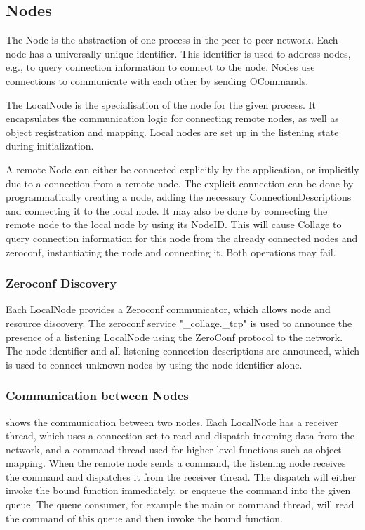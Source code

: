 \subsection{Nodes}

The \textsf{Node} is the abstraction of one process in the peer-to-peer network.
Each node has a universally unique identifier. This identifier is used to
address nodes, e.g., to query connection information to connect to the node.
Nodes use connections to communicate with each other by sending
\textsf{OCommand}s.

The \textsf{LocalNode} is the specialisation of the node for the given process.
It encapsulates the communication logic for connecting remote nodes, as well as
object registration and mapping. Local nodes are set up in the listening state
during initialization.

A remote \textsf{Node} can either be connected explicitly by the application,
or implicitly due to a connection from a remote node. The explicit connection
can be done by programmatically creating a node, adding the necessary
\textsf{ConnectionDescription}s and connecting it to the local node. It may
also be done by connecting the remote node to the local node by using its
\textsf{NodeID}. This will cause Collage to query connection information for
this node from the already connected nodes and zeroconf, instantiating the node
and connecting it. Both operations may fail.

\subsubsection{\label{sZeroconf}Zeroconf Discovery}

Each \textsf{LocalNode} provides a \textsf{Zeroconf} communicator, which allows
node and resource discovery. The zeroconf service "\_collage.\_tcp" is used to
announce the presence of a listening \textsf{LocalNode} using the ZeroConf
protocol to the network. The node identifier and all listening connection
descriptions are announced, which is used to connect unknown nodes by using the
node identifier alone.

\subsubsection{Communication between Nodes}

 shows the communication between two nodes. Each
\textsf{LocalNode} has a receiver thread, which uses a connection set to read
and dispatch incoming data from the network, and a command thread used for
higher-level functions such as object mapping. When the remote node sends a
command, the listening node receives the command and dispatches it from the
receiver thread. The dispatch will either invoke the bound function immediately,
or enqueue the command into the given queue. The queue consumer, for example the
main or command thread, will read the command of this queue and then invoke the
bound function.


